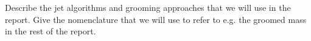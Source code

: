 Describe the jet algorithms and grooming approaches that we will use
in the report. Give the nomenclature that we will use to refer to
e.g. the groomed mass in the rest of the report.
